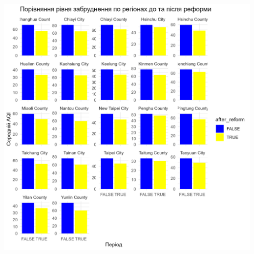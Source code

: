 \documentclass{article}
\begin{document}
\begin{enumerate}
\begin{center}
    \includegraphics[width=6in]{plots/question5/region_comparison_aqi.png}
    \end{center}


\end{enumerate}
\end{document}
